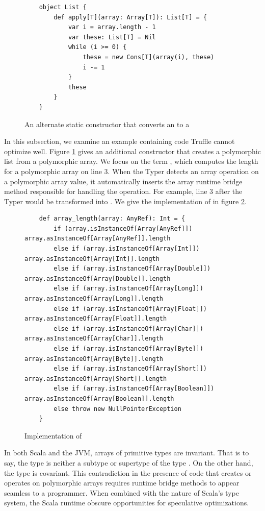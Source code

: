 \begin{figure}[!htb]
	\begin{verbatim}
	object List {
		def apply[T](array: Array[T]): List[T] = {
			var i = array.length - 1
			var these: List[T] = Nil
			while (i >= 0) {
				these = new Cons[T](array(i), these)
				i -= 1
			}
			these
		}	
	}
	\end{verbatim}
	\caption{An alternate static constructor that converts an  to a }
	\label{impl:list-alt-constructor}
\end{figure}

In this subsection, we examine an example containing code Truffle cannot optimize well.
Figure \ref{impl:list-alt-constructor} gives an additional constructor that creates a polymorphic list from a polymorphic array.
We focus on the term , which computes the length for a polymorphic array on line $3$.
When the Typer detects an array operation on a polymorphic array value, it automatically inserts the array runtime bridge method responsible for handling the operation.
For example, line $3$ after the Typer would be transformed into .
We give the implementation of  in figure \ref{impl:array-length}.

\begin{figure}[!htb]
	\begin{verbatim}
	def array_length(array: AnyRef): Int = {
		if (array.isInstanceOf[Array[AnyRef]])       array.asInstanceOf[Array[AnyRef]].length
		else if (array.isInstanceOf[Array[Int]])     array.asInstanceOf[Array[Int]].length
		else if (array.isInstanceOf[Array[Double]])  array.asInstanceOf[Array[Double]].length
		else if (array.isInstanceOf[Array[Long]])    array.asInstanceOf[Array[Long]].length
		else if (array.isInstanceOf[Array[Float]])   array.asInstanceOf[Array[Float]].length
		else if (array.isInstanceOf[Array[Char]])    array.asInstanceOf[Array[Char]].length
		else if (array.isInstanceOf[Array[Byte]])    array.asInstanceOf[Array[Byte]].length
		else if (array.isInstanceOf[Array[Short]])   array.asInstanceOf[Array[Short]].length
		else if (array.isInstanceOf[Array[Boolean]]) array.asInstanceOf[Array[Boolean]].length
		else throw new NullPointerException
	}
	\end{verbatim}
	\caption{Implementation of }
	\label{impl:array-length}
\end{figure}

In both Scala and the JVM, arrays of primitive types are invariant.
That is to say, the type  is neither a subtype or supertype of the type .
On the other hand, the type  is covariant.
This contradiction in the presence of code that creates or operates on polymorphic arrays requires runtime bridge methods to appear seamless to a programmer.
When combined with the nature of Scala's type system, the Scala runtime obscure opportunities for speculative optimizations.

